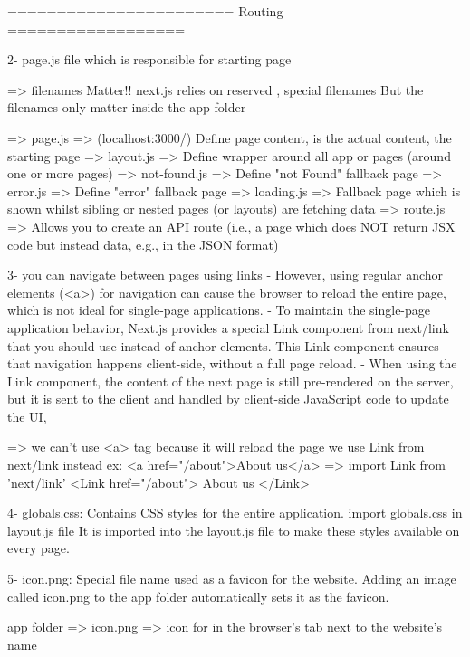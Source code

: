 ======================= Routing    ==================

2- page.js file which is responsible for starting page

    => filenames Matter!!
            next.js relies on reserved , special filenames
            But the filenames only matter inside the app folder

        => page.js => (localhost:3000/) Define page content, is the actual content, the starting page 
        => layout.js => Define wrapper around all app or  pages (around one or more pages)
        => not-found.js => Define "not Found" fallback page
        => error.js => Define "error" fallback page
        => loading.js => Fallback page which is shown whilst sibling or nested pages (or layouts) are fetching data
        => route.js => Allows you to create an API route (i.e., a page which does NOT return JSX code but instead data, e.g., in the JSON format)


3- you can navigate between pages using links
        - However, using regular anchor elements (<a>) for navigation can cause the browser to reload the entire page,
          which is not ideal for single-page applications.
        - To maintain the single-page application behavior, Next.js provides a special Link component from next/link that you should use instead of anchor elements. 
            This Link component ensures that navigation happens client-side, without a full page reload.
        - When using the Link component, the content of the next page is still pre-rendered on the server,
          but it is sent to the client and handled by client-side JavaScript code to update the UI, 

    => we can't use <a> tag because it will reload the page 
       we use Link from next/link instead
        ex:
            <a href="/about">About us</a>
            => import Link from 'next/link'
            <Link href="/about"> About us </Link>
         

4- globals.css: Contains CSS styles for the entire application.
    import globals.css in layout.js file
     It is imported into the layout.js file to make these styles available on every page.

5- icon.png: Special file name used as a favicon for the website.
    Adding an image called icon.png to the app folder automatically sets it as the favicon.

    app folder => icon.png => icon for in the browser's tab next to the website's name

